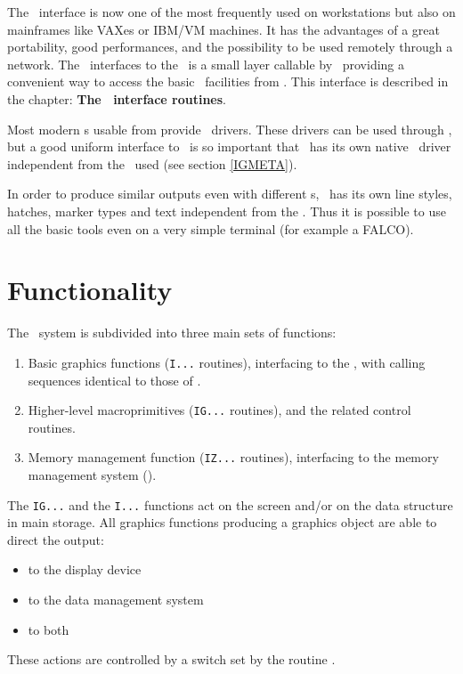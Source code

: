 The \XW~interface is now one of the most frequently used on workstations
but also on mainframes like VAXes or IBM/VM machines. It has the advantages
of a great portability, good performances, and the possibility to be used
remotely through a network. The \HIGZ~interfaces to the \XW~is a small
layer callable by \FORTRAN~providing a convenient way to access the basic 
\XLIB~facilities from \FORTRAN. This interface is described in the chapter:
{\bf The \XW~interface routines}.
 
Most modern \UGP s usable from \HIGZ{} provide \PS~drivers. These drivers
can be used through \HIGZ, but a good uniform interface to \PS~is so important
that \HIGZ~has its own native \PS~driver independent from the \UGP~used
(see section \ref{IGMETA}).
 
In order to produce similar outputs even with different \UGP s, \HIGZ~has its own
line styles, hatches, marker types and text independent from the \UGP. 
Thus it is possible to use all the basic tools even on a very simple terminal (for
example a FALCO).
 
\section{Functionality}
The \HIGZ~system is subdivided into three main sets of functions:
\begin{enumerate}
\item Basic graphics functions ({\tt I...} routines), interfacing to the \UGP,
      with calling sequences identical to those of \GKS.
\item Higher-level macroprimitives ({\tt IG...} routines), and the related 
      control routines.
\item Memory management function ({\tt IZ...} routines), interfacing to the
      memory management system (\ZEBRA).
\end{enumerate}
 
The {\tt IG...} and the {\tt I...} functions act on the screen and/or on the
data structure in main storage. All graphics functions producing a graphics
object are able to direct the output:
\begin{itemize}
\item to the display device
\item to the data management system
\item to both
\end{itemize}
 
These actions are controlled by a switch set by the routine .
 
